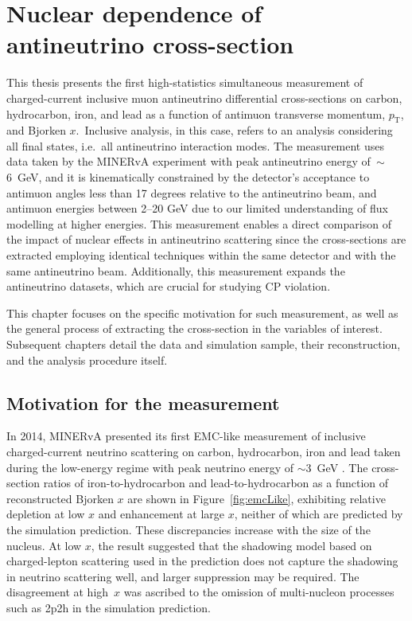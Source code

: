 \chapter{Nuclear dependence of antineutrino cross-section}

\vspace{-10pt}
\label{ch:measurement}
This thesis presents the first high-statistics simultaneous measurement of charged-current inclusive muon antineutrino differential cross-sections on carbon, hydrocarbon, iron, and lead as a function of antimuon transverse momentum, $p_{\text{T}}$, and Bjorken $x$.~Inclusive analysis, in this case, refers to an analysis considering all final states, i.e.~all antineutrino interaction modes. The measurement uses data taken by the MINERvA experiment with peak antineutrino energy of~$\sim$6~GeV, and it is kinematically constrained by the detector's acceptance to antimuon angles less than 17 degrees relative to the antineutrino beam, and antimuon energies between 2--20 GeV due to our limited understanding of flux modelling at higher energies. This measurement enables a direct comparison of the impact of nuclear effects in antineutrino scattering since the cross-sections are extracted employing identical techniques within the same detector and with the same antineutrino beam. Additionally, this measurement expands the antineutrino datasets, which are crucial for studying CP violation.

This chapter focuses on the specific motivation for such measurement, as well as the general process of extracting the cross-section in the variables of interest. Subsequent chapters detail the data and simulation sample, their reconstruction, and the analysis procedure itself.

\section{Motivation for the measurement}

In 2014, MINERvA presented its first EMC-like measurement of inclusive charged-current neutrino scattering on carbon, hydrocarbon, iron and lead taken during the low-energy regime with peak neutrino energy of $\sim$3~GeV \cite{Tice_PhysRevLett.112.231801}. The cross-section ratios of iron-to-hydrocarbon and lead-to-hydrocarbon as a function of reconstructed Bjorken $x$ are shown in Figure~\ref{fig:emcLike}, exhibiting relative depletion at low $x$ and enhancement at large $x$, neither of which are predicted by the simulation prediction. These discrepancies increase with the size of the nucleus. At low $x$, the result suggested that the shadowing model based on charged-lepton scattering used in the prediction does not capture the shadowing in neutrino scattering well, and larger suppression may be required. The disagreement at high~$x$ was ascribed to the omission of multi-nucleon processes such as 2p2h in the simulation prediction.

